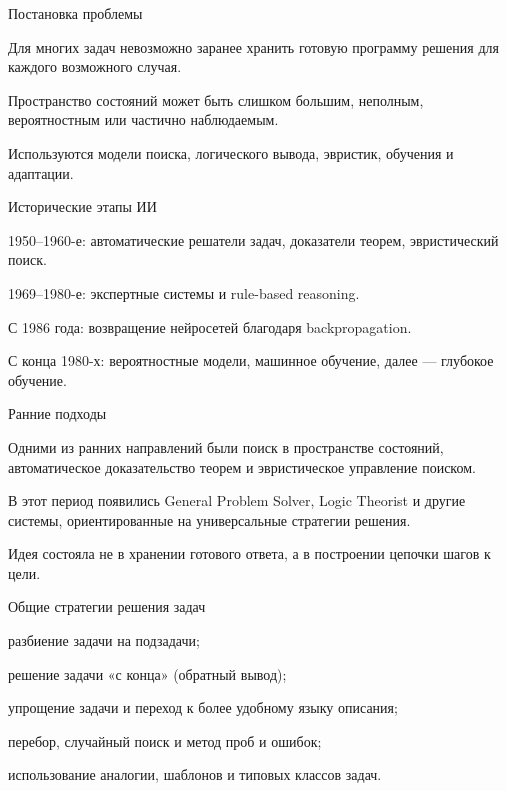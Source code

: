 \begin{frame}{Постановка проблемы}
	\topline
	\justifying
	
	\begin{textitemize}
		\item Для многих задач невозможно заранее хранить готовую программу решения для каждого возможного случая.
		\item Пространство состояний может быть слишком большим, неполным, вероятностным или частично наблюдаемым.
		\item Используются модели поиска, логического вывода, эвристик, обучения и адаптации.
	\end{textitemize}
\end{frame}

\begin{frame}{Исторические этапы ИИ}
	\topline
	\justifying
	
	\begin{textitemize}
		\item 1950–1960-е: автоматические решатели задач, доказатели теорем, эвристический поиск.
		\item 1969–1980-е: экспертные системы и rule-based reasoning.
		\item С 1986 года: возвращение нейросетей благодаря backpropagation.
		\item С конца 1980-х: вероятностные модели, машинное обучение, далее --- глубокое обучение.
	\end{textitemize}
\end{frame}

\begin{frame}{Ранние подходы}
	\topline
	\justifying
	
	\begin{textitemize}
		\item Одними из ранних направлений были поиск в пространстве состояний, автоматическое доказательство теорем и эвристическое управление поиском.
		\item В этот период появились General Problem Solver, Logic Theorist и другие системы, ориентированные на универсальные стратегии решения.
		\item Идея состояла не в хранении готового ответа, а в построении цепочки шагов к цели.
	\end{textitemize}
\end{frame}

\begin{frame}{Общие стратегии решения задач}
	\topline
	\justifying
	
	\begin{textitemize}
		\item разбиение задачи на подзадачи;
		\item решение задачи «с конца» (обратный вывод);
		\item упрощение задачи и переход к более удобному языку описания;
		\item перебор, случайный поиск и метод проб и ошибок;
		\item использование аналогии, шаблонов и типовых классов задач.
	\end{textitemize}
\end{frame}

